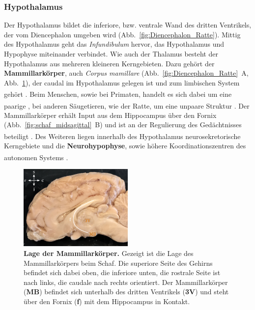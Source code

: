 \documentclass[12pt,a4paper,pdftex]{article}
\begin{document}
\subsubsection{Hypothalamus}
\label{subsubsec:Hypothalamus} 

Der Hypothalamus bildet die inferiore, bzw. ventrale Wand des dritten Ventrikels, der vom Diencephalon umgeben wird (Abb.~\ref{fig:Diencephalon_Ratte}). Mittig des Hypothalamus geht das \textit{Infundibulum} hervor, das Hypothalamus und Hypophyse miteinander verbindet. Wie auch der Thalamus besteht der Hypothalamus aus mehreren kleineren Kerngebieten. Dazu gehört der \textbf{Mammillarkörper}, auch \textit{Corpus mamillare} (Abb.~\ref{fig:Diencephalon_Ratte}~A, Abb.~\ref{fig:schaf_MB}), der caudal im Hypothalamus gelegen ist und zum limbischen System gehört \textsuperscript{\cite[16]{crossman2014neuroanatomy}}. Beim Menschen, sowie bei Primaten, handelt es sich dabei um eine paarige \textsuperscript{\cite[7]{crossman2014neuroanatomy}}, bei anderen Säugetieren, wie der Ratte, um eine unpaare Struktur \textsuperscript{\cite[13]{paxinos2014rat}}. Der Mammillarkörper erhält Input aus dem Hippocampus über den Fornix (Abb.~\ref{fig:schaf_midsagittal}~B) und ist an der Regulierung des Gedächtnisses beteiligt \textsuperscript{\cite[7]{neurowissenschaften_baer}}. Des Weiteren liegen innerhalb des Hypothalamus neurosekretorische Kerngebiete und die \textbf{Neurohypophyse}, sowie höhere Koordinationszentren des autonomen Systems \textsuperscript{\cite[6]{storch2012lehrbuchzoo}}.

\begin{figure}[H]
    \centering
    \includegraphics[width=0.5\textwidth]{pictures/Bilder_Jule/Schaf/Ausschnitte/MB.png}
    \caption[Lage der Mammillarkörper]{\textbf{Lage der Mammillarkörper.} Gezeigt ist die Lage des Mammillarkörpers beim Schaf. Die superiore Seite des Gehirns befindet sich dabei oben, die inferiore unten, die rostrale Seite ist nach links, die caudale nach rechts orientiert. Der Mammillarkörper (\textbf{MB}) befindet sich unterhalb des dritten Ventrikels (\textbf{3V}) und steht über den Fornix (\textbf{f}) mit dem Hippocampus in Kontakt.}
    \label{fig:schaf_MB}
\end{figure}{}
\end{document}
